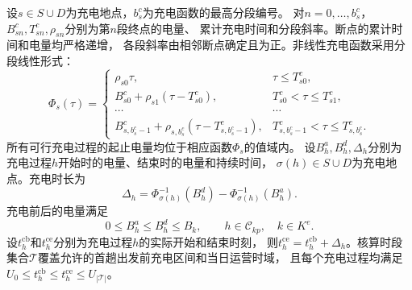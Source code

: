 \documentclass{setp-new}
\begin{document}
设$s\in S\cup D$为充电地点，$b_s^{c}$为充电函数的最高分段编号。
对$n=0,\ldots,b_s^{c}$，$B_{sn}^{c},T_{sn}^{c},\rho_{sn}$分别为第$n$段终点的电量、
累计充电时间和分段斜率。断点的累计时间和电量均严格递增，
各段斜率由相邻断点确定且为正。非线性充电函数采用分段线性形式\cite{ref:94}：
\begin{equation}
\Phi_s(\tau)=
\begin{cases}
\rho_{s0}\tau, & \tau\le T_{s0}^{c},\\
B_{s0}^{c}+\rho_{s1}(\tau-T_{s0}^{c}),
& T_{s0}^{c}<\tau\le T_{s1}^{c},\\
\cdots & \cdots\\
B_{s,b_s^{c}-1}^{c}+\rho_{s,b_s^{c}}(\tau-T_{s,b_s^{c}-1}^{c}),
& T_{s,b_s^{c}-1}^{c}<\tau\le T_{s,b_s^{c}}^{c}.
\end{cases}
\label{eq:unified-charge-function}
\end{equation}
所有可行充电过程的起止电量均位于相应函数$\Phi_s$的值域内。
设$B_h^{a},B_h^{d},\Delta_h$分别为充电过程$h$开始时的电量、结束时的电量和持续时间，
$\sigma(h)\in S\cup D$为充电地点。充电时长为\cite{ref:montoya}
\begin{equation}
\Delta_h=
\Phi_{\sigma(h)}^{-1}(B_h^{d})-
\Phi_{\sigma(h)}^{-1}(B_h^{a}).
\label{eq:unified-charge-duration}
\end{equation}
充电前后的电量满足
\begin{equation}
0\le B_h^{a}\le B_h^{d}\le B_k,
\qquad h\in\mathcal C_{kp},\quad k\in K^{e}.
\label{eq:unified-charge-energy-bound}
\end{equation}
设$t_h^{\mathrm{cb}}$和$t_h^{\mathrm{ce}}$分别为充电过程$h$的实际开始和结束时刻，
则$t_h^{\mathrm{ce}}=t_h^{\mathrm{cb}}+\Delta_h$。核算时段集合$\mathcal T$覆盖允许的首趟出发前充电区间和当日运营时域，
且每个充电过程均满足$U_0\le t_h^{\mathrm{cb}}\le t_h^{\mathrm{ce}}\le U_{|\mathcal T|}$。
\end{document}
